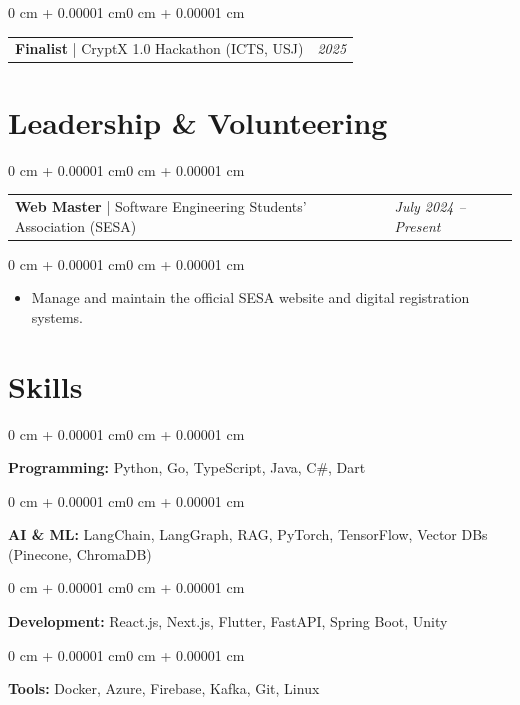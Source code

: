 \documentclass[10pt, letterpaper]{article}
\makeatletter
\newenvironment{highlights}{
    \begin{itemize}[
        topsep=0.10 cm,
        parsep=0.10 cm,
        partopsep=0pt,
        itemsep=0pt,
        leftmargin=0 cm + 10pt
    ]
}{
    \end{itemize}
}
\newenvironment{onecolentry}{
    \begin{adjustwidth}{0 cm + 0.00001 cm}{0 cm + 0.00001 cm}
}{
    \end{adjustwidth}
}
\newenvironment{twocolentry}{
    \begin{onecolentry}
    \begin{tabular}{@{}p{\dimexpr\textwidth-4.5cm\relax}>{\raggedleft\arraybackslash}p{4.5cm}@{}}
}{
    \end{tabular}
    \end{onecolentry}
}
\newcommand{\twocolitem}[2]{#1 & \textit{#2} \\}
\makeatother
\begin{document}
\begin{twocolentry}
\twocolitem{\textbf{Finalist} | CryptX 1.0 Hackathon (ICTS, USJ)}{2025}
\end{twocolentry}

\section{Leadership \& Volunteering}

\begin{twocolentry}
\twocolitem{\textbf{Web Master} | Software Engineering Students’ Association (SESA)}{July 2024 -- Present}
\end{twocolentry}

\vspace{0.08 cm}
\begin{onecolentry}
    \begin{highlights}
        \item Manage and maintain the official SESA website and digital registration systems.
    \end{highlights}
\end{onecolentry}

\section{Skills}

\begin{onecolentry}
\textbf{Programming:} Python, Go, TypeScript, Java, C\#, Dart
\end{onecolentry}

\vspace{0.08 cm}
\begin{onecolentry}
\textbf{AI \& ML:} LangChain, LangGraph, RAG, PyTorch, TensorFlow, Vector DBs (Pinecone, ChromaDB)
\end{onecolentry}

\vspace{0.08 cm}
\begin{onecolentry}
\textbf{Development:} React.js, Next.js, Flutter, FastAPI, Spring Boot, Unity
\end{onecolentry}

\vspace{0.08 cm}
\begin{onecolentry}
\textbf{Tools:} Docker, Azure, Firebase, Kafka, Git, Linux
\end{onecolentry}
\end{document}
